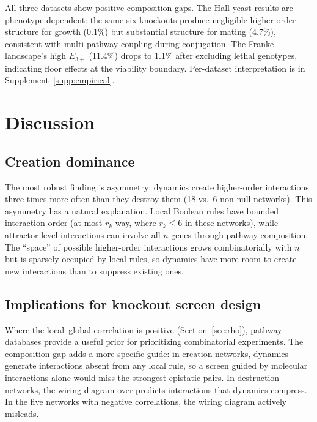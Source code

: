 \documentclass[10pt]{article}
\begin{document}
All three datasets show positive composition gaps. The Hall yeast
results are phenotype-dependent: the same six knockouts produce
negligible higher-order structure for growth (0.1\%) but substantial
structure for mating (4.7\%), consistent with multi-pathway coupling
during conjugation. The Franke landscape's high $E_{3+}$ (11.4\%)
drops to 1.1\% after excluding lethal genotypes, indicating floor
effects at the viability boundary. Per-dataset interpretation is in
Supplement~\ref{supp:empirical}.


\section{Discussion}
\label{sec:discussion}

\subsection{Creation dominance}

The most robust finding is asymmetry: dynamics create higher-order
interactions three times more often than they destroy them (18 vs.\ 6
non-null networks). This asymmetry has a natural explanation. Local
Boolean rules have bounded interaction order (at most $r_k$-way,
where $r_k \leq 6$ in these networks), while attractor-level
interactions can involve all $n$ genes through pathway composition.
The ``space'' of possible higher-order interactions grows
combinatorially with $n$ but is sparsely occupied by local rules,
so dynamics have more room to create new interactions than to
suppress existing ones.

\subsection{Implications for knockout screen design}

Where the local--global correlation is positive
(Section~\ref{sec:rho}), pathway databases provide a useful prior
for prioritizing combinatorial experiments. The composition gap
adds a more specific guide: in creation networks, dynamics generate
interactions absent from any local rule, so a screen guided by
molecular interactions alone would miss the strongest epistatic
pairs. In destruction networks, the wiring diagram over-predicts
interactions that dynamics compress. In the five networks with
negative correlations, the wiring diagram actively misleads.
\end{document}
